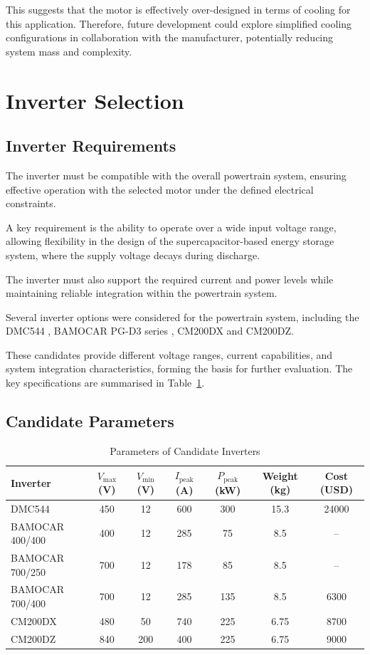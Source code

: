 \documentclass[11pt, a4paper]{report}
\numberwithin{equation}{section}
\begin{document}
This suggests that the motor is effectively over-designed in terms of cooling for this application. Therefore, future development could explore simplified cooling configurations in collaboration with the manufacturer, potentially reducing system mass and complexity.


\section{Inverter Selection}

\subsection{Inverter Requirements}

The inverter must be compatible with the overall powertrain system, ensuring effective operation with the selected motor under the defined electrical constraints.

A key requirement is the ability to operate over a wide input voltage range, allowing flexibility in the design of the supercapacitor-based energy storage system, where the supply voltage decays during discharge.

The inverter must also support the required current and power levels while maintaining reliable integration within the powertrain system.

Several inverter options were considered for the powertrain system, including the DMC544\cite{DMC544_datasheet}
, BAMOCAR PG-D3 series\cite{BAMOCAR_data_sheet}
, CM200DX and CM200DZ\cite{CM200_data_sheet}.

These candidates provide different voltage ranges, current capabilities, and system integration characteristics, forming the basis for further evaluation. The key specifications are summarised in Table~\ref{tab:inverter_parameters}.

\subsection{Candidate Parameters}

\begin{table}[H]
\centering
\caption{Parameters of Candidate Inverters}
\label{tab:inverter_parameters}
\begin{tabular}{lcccccc}
\toprule
Inverter & $V_{\text{max}}$ (V) & $V_{\text{min}}$ (V) & $I_{\text{peak}}$ (A) & $P_{\text{peak}}$ (kW) & Weight (kg) & Cost (USD) \\
\midrule
DMC544 & 450 & 12 & 600 & 300 & 15.3 & 24000 \\
BAMOCAR 400/400 & 400 & 12 & 285 & 75 & 8.5 & -- \\
BAMOCAR 700/250 & 700 & 12 & 178 & 85 & 8.5 & -- \\
BAMOCAR 700/400 & 700 & 12 & 285 & 135 & 8.5 & 6300 \\
CM200DX & 480 & 50 & 740 & 225 & 6.75 & 8700 \\
CM200DZ & 840 & 200 & 400 & 225 & 6.75 & 9000 \\
\bottomrule
\end{tabular}
\end{table}
\end{document}

